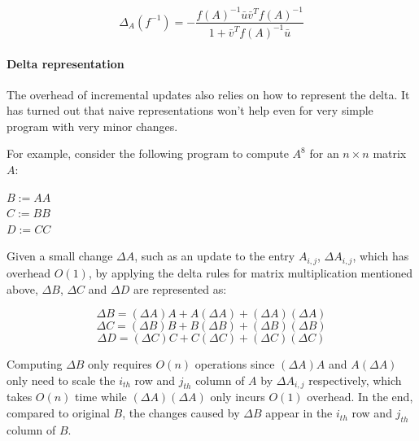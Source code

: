 \begin{equation}\label{eq: matrix_inverse}
\Delta_A(f^{-1}) = -\frac{f(A)^{-1}\bar{u}\bar{v}^Tf(A)^{-1}}{1+\bar{v}^Tf(A)^{-1}\bar{u}}
\end{equation}

\paragraph{Delta representation}
The overhead of incremental updates also relies on how to represent the delta. It has turned out that naive representations won't help even for very simple program with very minor changes. 

\begin{example}\label{eg: incremental_naive_update}
For example, consider the following program to compute $A^8$ for an $n\times n$ matrix $A$:

\begin{center}
    $B:= AA$\\
    $C:= BB$\\
    $D:= CC$
\end{center}

Given a small change $\Delta A$, such as an update to the entry $A_{i,j}$, $\Delta A_{i,j}$, which has overhead $O(1)$, by applying the delta rules for matrix multiplication mentioned above, $\Delta B$, $\Delta C$ and $\Delta D$ are represented as:

\begin{equation}\label{eq: delta_b}
    \Delta B = (\Delta A) A + A (\Delta A) + (\Delta A) (\Delta A)
\end{equation}
\begin{equation}\label{eq: delta_c}
    \Delta C = (\Delta B) B + B (\Delta B) + (\Delta B) (\Delta B)
\end{equation}
\begin{equation}\label{eq: delta_d}
    \Delta D = (\Delta C) C + C (\Delta C) + (\Delta C) (\Delta C)
\end{equation}
    


Computing $\Delta B$ only requires $O(n)$ operations since $(\Delta A) A$ and $A (\Delta A)$ only need to scale the $i_{th}$ row and $j_{th}$ column of $A$ by $\Delta A_{i,j}$ respectively, which takes $O(n)$ time while $(\Delta A) (\Delta A)$ only incurs $O(1)$ overhead. In the end, compared to original $B$, the changes caused by $\Delta B$ appear in the $i_{th}$ row and $j_{th}$ column of $B$.


\end{example}
